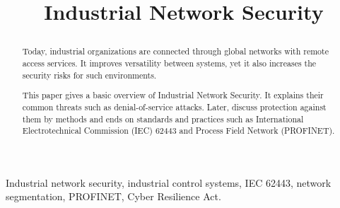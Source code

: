 \documentclass[conference]{IEEEtran}
\begin{document}
\title{Industrial Network Security\\
{\footnotesize \textsuperscript{}}

}

\author{
\and
{}
\and
{}
\and
\IEEEauthorblockN{}
\IEEEauthorblockA{}

\and
{}
}
\maketitle

\begin{abstract}
Today, industrial organizations are connected through global networks with remote access services. It improves versatility between systems, yet it also increases the security risks for such environments.

This paper gives a basic overview of Industrial Network Security. It explains their common threats such as denial-of-service attacks. Later, discuss protection against them by  methods and ends on standards and practices such as International Electrotechnical Commission (IEC) 62443 and Process Field Network (PROFINET).
\end{abstract}

\begin{IEEEkeywords}
Industrial network security, industrial control systems, IEC 62443, network segmentation, PROFINET, Cyber Resilience Act.
\end{IEEEkeywords}
\end{document}
